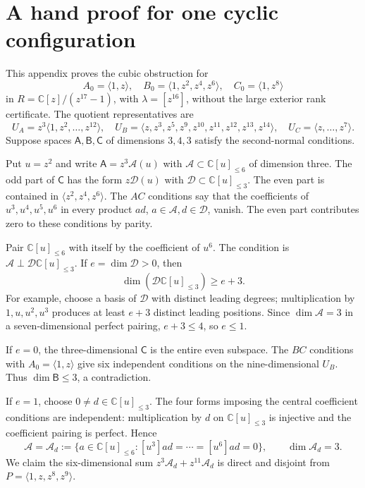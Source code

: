 \documentclass[11pt]{article}
\theoremstyle{definition}\newtheorem{definition}[theorem]{Definition}
\theoremstyle{remark}\newtheorem{remark}[theorem]{Remark}
\newcommand{\C}{\mathbb C}
\begin{document}
\appendix
\section{A hand proof for one cyclic configuration}\label{app:hand}

This appendix proves the cubic obstruction for
\[
 A_0=\langle1,z\rangle,\quad
 B_0=\langle1,z^2,z^4,z^6\rangle,\quad
 C_0=\langle1,z^8\rangle
\]
in $R=\C[z]/(z^{17}-1)$, with $\lambda=[z^{16}]$, without the large exterior
rank certificate. The quotient representatives are
\[
 U_A=z^3\langle1,z^2,\ldots,z^{12}\rangle,\quad
 U_B=\langle z,z^3,z^5,z^9,z^{10},z^{11},z^{12},z^{13},z^{14}\rangle,
 \quad U_C=\langle z,\ldots,z^7\rangle.
\]
Suppose spaces $\mathsf A,\mathsf B,\mathsf C$ of dimensions $3,4,3$ satisfy
the second-normal conditions.

Put $u=z^2$ and write $\mathsf A=z^3\mathcal A(u)$ with
$\mathcal A\subset\C[u]_{\leq6}$ of dimension three. The odd part of
$\mathsf C$ has the form $z\mathcal D(u)$ with
$\mathcal D\subset\C[u]_{\leq3}$. The even part is contained in
$\langle z^2,z^4,z^6\rangle$. The $AC$ conditions say that the coefficients
of $u^3,u^4,u^5,u^6$ in every product $ad$, $a\in\mathcal A,d\in\mathcal D$,
vanish. The even part contributes zero to these conditions by parity.

Pair $\C[u]_{\leq6}$ with itself by the coefficient of $u^6$. The condition
is $\mathcal A\perp\mathcal D\C[u]_{\leq3}$. If $e=\dim\mathcal D>0$, then
\[
 \dim(\mathcal D\C[u]_{\leq3})\geq e+3.
\]
For example, choose a basis of $\mathcal D$ with distinct leading degrees;
multiplication by $1,u,u^2,u^3$ produces at least $e+3$ distinct leading
positions. Since $\dim\mathcal A=3$ in a seven-dimensional perfect pairing,
$e+3\leq4$, so $e\leq1$.

If $e=0$, the three-dimensional $\mathsf C$ is the entire even subspace.
The $BC$ conditions with $A_0=\langle1,z\rangle$ give six independent
conditions on the nine-dimensional $U_B$. Thus $\dim\mathsf B\leq3$, a
contradiction.

If $e=1$, choose $0\ne d\in\C[u]_{\leq3}$. The four forms imposing the
central coefficient conditions are independent: multiplication by $d$ on
$\C[u]_{\leq3}$ is injective and the coefficient pairing is perfect. Hence
\[
 \mathcal A=\mathcal A_d:=\{a\in\C[u]_{\leq6}:
                       [u^3]ad=\cdots=[u^6]ad=0\},\qquad\dim\mathcal A_d=3.
\]
We claim the six-dimensional sum
$z^3\mathcal A_d+z^{11}\mathcal A_d$ is direct and disjoint from
$P=\langle1,z,z^8,z^9\rangle$.
\end{document}
